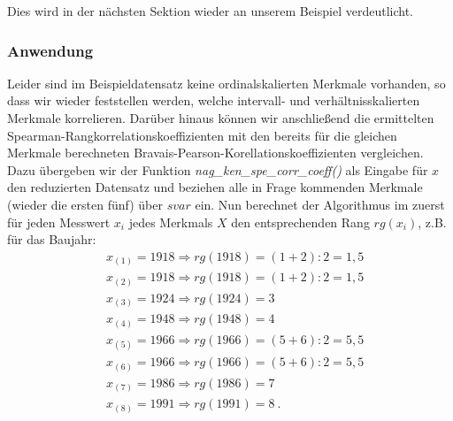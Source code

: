 Dies wird in der nächsten Sektion wieder an unserem Beispiel verdeutlicht.

\subsubsection{Anwendung}
\label{sec:spear_rangkorr_anw}

Leider sind im Beispieldatensatz keine ordinalskalierten Merkmale vorhanden, so dass wir wieder feststellen werden, welche intervall- und verhältnisskalierten Merkmale korrelieren. Darüber hinaus können wir anschließend die ermittelten Spearman-Rangkorrelationskoeffizienten mit den bereits für die gleichen Merkmale berechneten Bravais-Pearson-Korellationskoeffizienten vergleichen. Dazu übergeben wir der Funktion {\it nag\_ken\_spe\_corr\_coeff()} als Eingabe für $x$ den reduzierten Datensatz und beziehen alle in Frage kommenden Merkmale (wieder die ersten fünf) über $svar$ ein. Nun berechnet der Algorithmus im zuerst für jeden Messwert $x_i$ jedes Merkmals $X$ den entsprechenden Rang $rg(x_i)$, z.B. für das Baujahr:
\begin{equation*}
	\begin{split}
		& x_{(1)}=1918 \Rightarrow rg(1918)=(1+2):2=1,5\\
		& x_{(2)}=1918 \Rightarrow rg(1918)=(1+2):2=1,5\\
		& x_{(3)}=1924 \Rightarrow rg(1924)=3\\
		& x_{(4)}=1948 \Rightarrow rg(1948)=4\\
		& x_{(5)}=1966 \Rightarrow rg(1966)=(5+6):2=5,5\\
		& x_{(6)}=1966 \Rightarrow rg(1966)=(5+6):2=5,5\\
		& x_{(7)}=1986 \Rightarrow rg(1986)=7\\
		& x_{(8)}=1991 \Rightarrow rg(1991)=8 ~.
	\end{split}
\end{equation*}

